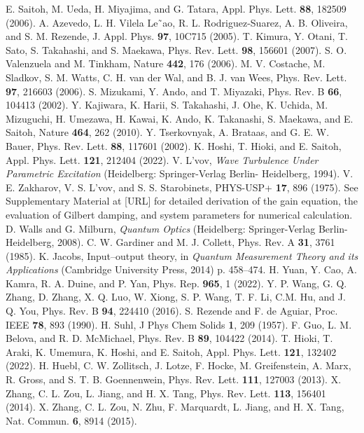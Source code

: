 \documentclass[%
 reprint,
 amsmath,amssymb,
 aps,
prb,
]{revtex4-2}
\begin{document}
\begin{thebibliography}{30}
 E. Saitoh, M. Ueda, H. Miyajima, and G. Tatara, Appl. Phys. Lett. {\bf 88}, 182509 (2006).
 A. Azevedo, L. H. Vilela Le˜ao, R. L. Rodriguez-Suarez, A. B. Oliveira, and S. M. Rezende, J. Appl. Phys. {\bf 97}, 10C715 (2005).
 T. Kimura, Y. Otani, T. Sato, S. Takahashi, and S. Maekawa, Phys. Rev. Lett. {\bf 98}, 156601 (2007).
 S. O. Valenzuela and M. Tinkham, Nature {\bf 442}, 176 (2006).
 M. V. Costache, M. Sladkov, S. M. Watts, C. H. van der Wal, and B. J. van Wees, Phys. Rev. Lett. {\bf 97}, 216603 (2006).
 S. Mizukami, Y. Ando, and T. Miyazaki, Phys. Rev. B {\bf 66}, 104413 (2002).
 Y. Kajiwara, K. Harii, S. Takahashi, J. Ohe, K. Uchida, M. Mizuguchi, H. Umezawa, H. Kawai, K. Ando, K. Takanashi, S. Maekawa, and E. Saitoh, Nature {\bf 464}, 262 (2010).
 Y. Tserkovnyak, A. Brataas, and G. E. W. Bauer, Phys. Rev. Lett. {\bf 88}, 117601 (2002).
 K. Hoshi, T. Hioki, and E. Saitoh, Appl. Phys. Lett. {\bf 121}, 212404 (2022).
 V. L’vov, {\textit{Wave Turbulence Under Parametric Excitation}} (Heidelberg: Springer-Verlag Berlin- Heidelberg, 1994).
 V. E. Zakharov, V. S. L’vov, and S. S. Starobinets, PHYS-USP+ {\bf 17}, 896 (1975).
 See Supplementary Material at [URL] for detailed derivation of the gain equation, the evaluation of Gilbert damping, and system parameters for numerical calculation.
 D. Walls and G. Milburn, {\textit{Quantum Optics}} (Heidelberg: Springer-Verlag Berlin- Heidelberg, 2008).
 C. W. Gardiner and M. J. Collett, Phys. Rev. A {\bf 31}, 3761 (1985).
 K. Jacobs, Input–output theory, in {\textit{Quantum Measurement Theory and its Applications}} (Cambridge University
Press, 2014) p. 458–474.
 H. Yuan, Y. Cao, A. Kamra, R. A. Duine, and P. Yan, Phys. Rep. {\bf 965}, 1 (2022).
 Y. P. Wang, G. Q. Zhang, D. Zhang, X. Q. Luo, W. Xiong, S. P. Wang, T. F. Li, C.M. Hu, and J. Q. You, Phys. Rev. B {\bf 94}, 224410 (2016).
 S. Rezende and F. de Aguiar, Proc. IEEE {\bf 78}, 893 (1990).
 H. Suhl, J Phys Chem Solids {\bf 1}, 209 (1957).
 F. Guo, L. M. Belova, and R. D. McMichael, Phys. Rev. B {\bf 89}, 104422 (2014).
 T. Hioki, T. Araki, K. Umemura, K. Hoshi, and E. Saitoh, Appl. Phys. Lett. {\bf 121}, 132402 (2022).
 H. Huebl, C. W. Zollitsch, J. Lotze, F. Hocke, M. Greifenstein, A. Marx, R. Gross, and S. T. B. Goennenwein, Phys. Rev. Lett. {\bf 111}, 127003 (2013).
 X. Zhang, C. L. Zou, L. Jiang, and H. X. Tang, Phys. Rev. Lett. {\bf 113}, 156401 (2014).
 X. Zhang, C. L. Zou, N. Zhu, F. Marquardt, L. Jiang, and H. X. Tang, Nat. Commun. {\bf 6}, 8914 (2015).
\end{thebibliography}
\end{document}
